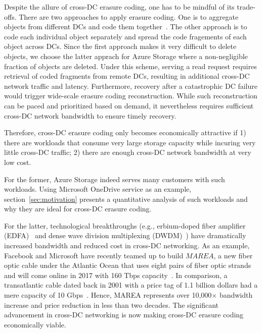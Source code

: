 Despite the allure of cross-DC erasure coding, one has to be mindful of its trade-offs. There are two approaches to apply erasure coding.  One is to aggregate objects from different DCs and code them together~\cite{f4:osdi14}.  The other approach is to code each individual object separately and spread the code fragements of each object across DCs.  Since the first approach makes it 
very difficult to delete objects, we choose the latter apprach for Azure Storage where a non-negligible fraction of objects are deleted. Under this scheme, serving a read request requires retrieval of coded fragments from remote DCs, resulting in additional cross-DC network traffic and latency. Furthermore, recovery after a catastrophic DC failure would trigger wide-scale erasure coding reconstruction. While such reconstruction can be paced and prioritized based on demand, it nevertheless requires sufficient cross-DC network bandwidth to ensure timely recovery.

Therefore, cross-DC erasure coding only becomes economically attractive if 1) there are workloads that consume very large storage capacity while incuring very little cross-DC traffic; 2) there are enough cross-DC network bandwidth at very low cost.

For the former, Azure Storage indeed serves many customers with such workloads. Using Microsoft OneDrive service as an example, section~\ref{sec:motivation} presents a quantitative analysis of such workloads and why they are ideal for cross-DC erasure coding.

For the latter, technological breakthroughs (e.g., erbium-doped fiber amplifier (EDFA)~\cite{mears1986low} and dense wave division multiplexing (DWDM)~\cite{zhu2011112}) have dramatically increased bandwidth and reduced cost in cross-DC networking. As an example, Facebook and Microsoft have recently teamed up to build $MAREA$, a new fiber optic cable under the Atlantic Ocean that uses eight pairs of fiber optic strands and will come online in 2017 with 160 Tbps capacity~\cite{bib:MAREA1, bib:MAREA2}. In comparison, a transatlantic cable dated back in 2001 with a price tag of 1.1 billion dollars had a mere capacity of 10 Gbps~\cite{bib:FA-1}. Hence, MAREA represents over 10,000$\times$ bandwidth increase and price reduction in less than two decades. The significant advancement in cross-DC networking is now making cross-DC erasure coding economically viable.


